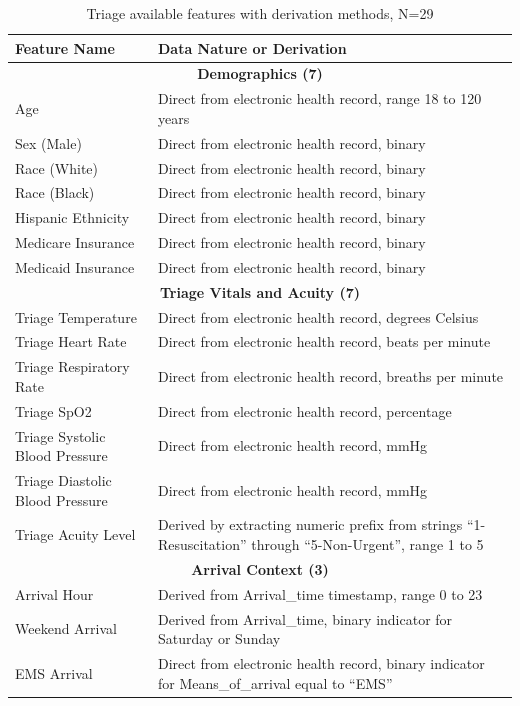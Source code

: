 \documentclass[harvard,article]{frontiersinFPHY_FAMS}
\begin{document}
\begin{table}[t]
\centering
\small
\caption{Triage available features with derivation methods, N=29}
\label{tab:features}
\begin{tabularx}{\textwidth}{@{}l X@{}}
\toprule
\textbf{Feature Name} & \textbf{Data Nature or Derivation} \\
\midrule
\multicolumn{2}{c}{\textbf{Demographics (7)}} \\
\midrule
Age & Direct from electronic health record, range 18 to 120 years \\
Sex (Male) & Direct from electronic health record, binary \\
Race (White) & Direct from electronic health record, binary \\
Race (Black) & Direct from electronic health record, binary \\
Hispanic Ethnicity & Direct from electronic health record, binary \\
Medicare Insurance & Direct from electronic health record, binary \\
Medicaid Insurance & Direct from electronic health record, binary \\
\midrule
\multicolumn{2}{c}{\textbf{Triage Vitals and Acuity (7)}} \\
\midrule
Triage Temperature & Direct from electronic health record, degrees Celsius \\
Triage Heart Rate & Direct from electronic health record, beats per minute \\
Triage Respiratory Rate & Direct from electronic health record, breaths per minute \\
Triage SpO2 & Direct from electronic health record, percentage \\
Triage Systolic Blood Pressure & Direct from electronic health record, mmHg \\
Triage Diastolic Blood Pressure & Direct from electronic health record, mmHg \\
Triage Acuity Level & Derived by extracting numeric prefix from strings ``1-Resuscitation'' through ``5-Non-Urgent'', range 1 to 5 \\
\midrule
\multicolumn{2}{c}{\textbf{Arrival Context (3)}} \\
\midrule
Arrival Hour & Derived from Arrival\_time timestamp, range 0 to 23 \\
Weekend Arrival & Derived from Arrival\_time, binary indicator for Saturday or Sunday \\
EMS Arrival & Direct from electronic health record, binary indicator for Means\_of\_arrival equal to ``EMS'' \\

\end{tabularx}
\end{table}
\end{document}
